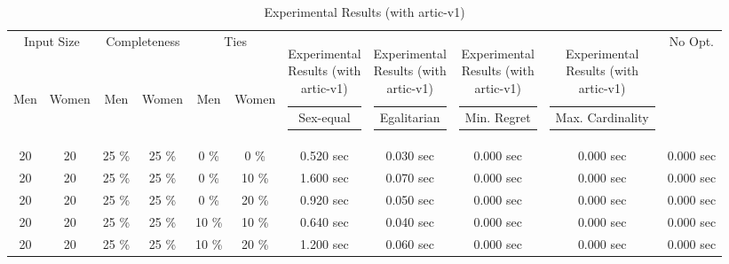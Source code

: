 \documentclass{article}
\begin{document}
\setlength\LTleft{-1.3in}

\small

\begin{longtable}[]{@{}ccccccccccc@{}}

\caption{Experimental Results (with artic-v1)}
\label{exp-artic-v1}\\

\hline \multicolumn{2}{c}{Input Size} & \multicolumn{2}{c}{Completeness} & \multicolumn{2}{c}{Ties} & \multicolumn{1}{c}{\multirow{2}{*}{\begin{tabular}[c]{@{}c@{}}Sex-equal\end{tabular}}} & \multicolumn{1}{c}{\multirow{2}{*}{\begin{tabular}[c]{@{}c@{}}Egalitarian\end{tabular}}} & \multicolumn{1}{c}{\multirow{2}{*}{\begin{tabular}[c]{@{}c@{}}Min. Regret\end{tabular}}} & \multicolumn{1}{c}{\multirow{2}{*}{\begin{tabular}[c]{@{}c@{}}Max. Cardinality\end{tabular}}} & \multicolumn{1}{c}{\multirow{2}{*}{No Opt.}} \\
Men           & Women          & Men             & Women          & Men         & Women      & \multicolumn{1}{c}{}                                                                                  & \multicolumn{1}{c}{}                                                                                    & \multicolumn{1}{c}{}                                                                                       & \multicolumn{1}{c}{}                                                                                            & \multicolumn{1}{c}{}                                 \\ \hline
\endhead
%
\bottomrule
\endfoot
%
\endlastfoot
%
20 & 20 & 25 \% & 25 \% & 0 \% & 0 \% & 0.520 sec & 0.030 sec & 0.000 sec & 0.000 sec & 0.000 sec \\
20 & 20 & 25 \% & 25 \% & 0 \% & 10 \% & 1.600 sec & 0.070 sec & 0.000 sec & 0.000 sec & 0.000 sec \\
20 & 20 & 25 \% & 25 \% & 0 \% & 20 \% & 0.920 sec & 0.050 sec & 0.000 sec & 0.000 sec & 0.000 sec \\
20 & 20 & 25 \% & 25 \% & 10 \% & 10 \% & 0.640 sec & 0.040 sec & 0.000 sec & 0.000 sec & 0.000 sec \\
20 & 20 & 25 \% & 25 \% & 10 \% & 20 \% & 1.200 sec & 0.060 sec & 0.000 sec & 0.000 sec & 0.000 sec \\

\end{longtable}
\end{document}
